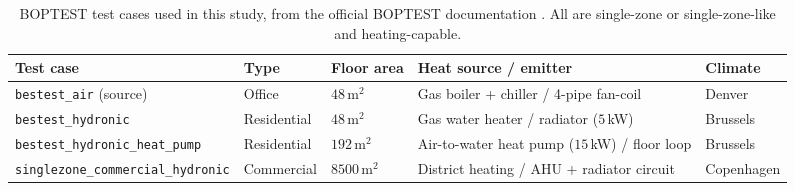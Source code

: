 \documentclass[a4paper,fleqn]{cas-sc}
\begin{document}
\begin{table}[pos={!ht}]
\centering
\caption{BOPTEST test cases used in this study, from the official BOPTEST documentation \citep{Blum2021BOPTEST}. All are single-zone or single-zone-like and heating-capable.}
\label{tab:testcases}
\footnotesize
\begin{tabularx}{\linewidth}{@{}l l l X l@{}}
\toprule
Test case & Type & Floor area & Heat source / emitter & Climate \\
\midrule
\texttt{bestest\_air} (source) & Office & $48$\,m$^2$ & Gas boiler + chiller / 4-pipe fan-coil & Denver \\
\texttt{bestest\_hydronic} & Residential & $48$\,m$^2$ & Gas water heater / radiator ($5$\,kW) & Brussels \\
\texttt{bestest\_hydronic\_heat\_pump} & Residential & $192$\,m$^2$ & Air-to-water heat pump ($15$\,kW) / floor loop & Brussels \\
\texttt{singlezone\_commercial\_hydronic} & Commercial & $8500$\,m$^2$ & District heating / AHU + radiator circuit & Copenhagen \\
\bottomrule
\end{tabularx}
\end{table}
\end{document}
